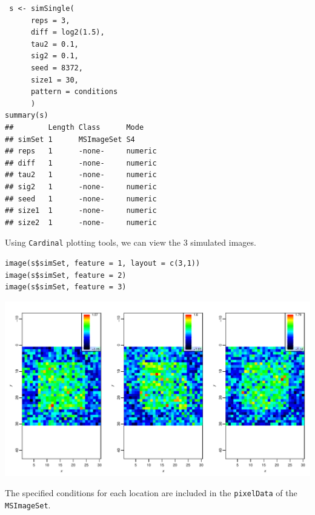\documentclass[a4paper]{article}\usepackage[]{graphicx}\usepackage[]{color}
\makeatletter
\def\maxwidth{ %
  \ifdim\Gin@nat@width>\linewidth
    \linewidth
  \else
    \Gin@nat@width
  \fi
}
\newenvironment{kframe}{%
 \def\at@end@of@kframe{}%
 \ifinner\ifhmode%
  \def\at@end@of@kframe{\end{minipage}}%
  \begin{minipage}{\columnwidth}%
 \fi\fi%
 \def\FrameCommand##1{\hskip\@totalleftmargin \hskip-\fboxsep
 \colorbox{shadecolor}{##1}\hskip-\fboxsep
     \hskip-\linewidth \hskip-\@totalleftmargin \hskip\columnwidth}%
 \MakeFramed {\advance\hsize-\width
   \@totalleftmargin\z@ \linewidth\hsize
   \@setminipage}}%
 {\par\unskip\endMakeFramed%
 \at@end@of@kframe}
\newenvironment{knitrout}{}{} %
\makeatother
\begin{document}
\begin{knitrout}
\color{fgcolor}\begin{kframe}
\begin{verbatim}
 s <- simSingle(
      reps = 3,
      diff = log2(1.5),
      tau2 = 0.1,
      sig2 = 0.1,
      seed = 8372,
      size1 = 30,
      pattern = conditions
      )
summary(s)
##        Length Class      Mode   
## simSet 1      MSImageSet S4     
## reps   1      -none-     numeric
## diff   1      -none-     numeric
## tau2   1      -none-     numeric
## sig2   1      -none-     numeric
## seed   1      -none-     numeric
## size1  1      -none-     numeric
## size2  1      -none-     numeric
\end{verbatim}
\end{kframe}
\end{knitrout}

Using \texttt{Cardinal} plotting tools, we can view the 3 simulated images.
\begin{knitrout}
\color{fgcolor}\begin{kframe}
\begin{verbatim}
image(s$simSet, feature = 1, layout = c(3,1))
image(s$simSet, feature = 2)
image(s$simSet, feature = 3)
\end{verbatim}
\end{kframe}

{\centering \includegraphics[width=\maxwidth]{figure/unnamed-chunk-5-1} 

}



\end{knitrout}

The specified conditions for each location are included in the \texttt{pixelData} of the \texttt{MSImageSet}.
\end{document}
